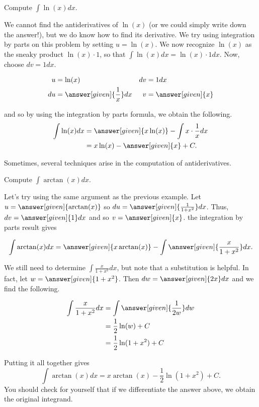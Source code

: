 \documentclass[noauthor]{ximera}
\begin{document}
\begin{example}
Compute $\int \ln(x)dx$.

\begin{explanation}
We cannot find the antiderivatives of $\ln(x)$ (or we could simply write down the answer!), but we do know how to find its derivative.  We try using integration by parts on this problem by setting $u=\ln(x)$.  We now recognize $\ln(x)$ as the sneaky product $\ln(x) \cdot 1$, so that $\int \ln(x) dx = \ln(x) \cdot 1 dx$.  Now, choose $dv = 1 dx$.  

\begin{align*}
u &= \ln(x) & dv & =1 dx \\
 du &= \answer[given]{\frac{1}{x}} dx & v&= \answer[given]{x}
\end{align*}

and so by using the integration by parts formula, we obtain the following.
\begin{align*}
 \int \ln(x)dx&=\answer[given]{x \ln(x)}-\int x \cdot \frac{1}{x}dx\\
&= x\ln (x)- \answer[given]{x}+C.\\
\end{align*}
\end{explanation}
\end{example}

Sometimes, several techniques arise in the computation of antiderivatives.

\begin{example}
Compute $\int \arctan(x) dx$.

\begin{explanation}
Let's try using the same argument as the previous example.  Let $u=\answer[given]{\arctan (x)}$ so $du=\answer[given]{\frac{1}{1+x^{2}} } dx$. Thus, $dv=\answer[given]{1} dx$ and so $v=\answer[given]{x}$.  the integration by parts result gives 


\[
\int \arctan(x) dx= \answer[given]{x\arctan(x)}- \int \answer[given]{\frac{x}{1+x^2}} dx.
\]

We still need to determine $\int \frac{x}{1+x^{2}} dx$, but note that a substitution is helpful.  In fact, let $w=\answer[given]{1+x^2}$. Then $dw=\answer[given]{2 x} dx$ and we find the following.

\begin{align*}
\int \frac{x}{1+x^{2}} dx &= \int \answer[given]{\frac{1}{2 w}} dw \\
&= \frac{1}{2} \ln(w) + C\\
&=\frac{1}{2} \ln(1+x^{2})+C 
\end{align*}

Putting it all together gives
\[ 
\int \arctan(x) dx = x \arctan(x) -\frac{1}{2} \ln(1+x^{2}) +C.
\]
You should check for yourself that if we differentiate the answer above, we obtain the original integrand.

\end{explanation}

\end{example}
\end{document}
